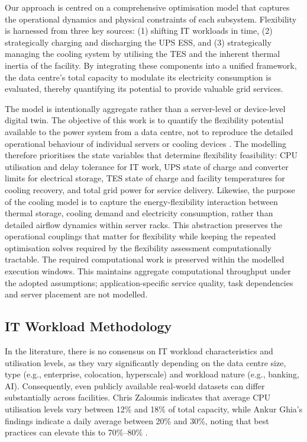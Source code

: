 \documentclass[lettersize,journal]{IEEEtran}
\providecommand{\DIFadd}[1]{{\color{blue}#1}}
\providecommand{\DIFaddbegin}{}
\providecommand{\DIFaddend}{}
\begin{document}
Our approach is centred on a comprehensive optimisation model that captures the operational dynamics and physical constraints of each subsystem. Flexibility is harnessed from three key sources: (1) shifting IT workloads in time, (2) strategically charging and discharging the  \DIFaddbegin \DIFadd{UPS ESS}\DIFaddend , and (3) strategically managing the cooling system by utilising the TES and the inherent thermal inertia of the facility. By integrating these components into a unified framework, the data centre's total capacity to modulate its electricity consumption is evaluated, thereby quantifying its potential to provide valuable grid services.

\DIFaddbegin \DIFadd{The model is intentionally aggregate rather than a server-level or device-level digital twin. The objective of this work is to quantify the flexibility potential available to the power system from a data centre, not to reproduce the detailed operational behaviour of individual servers or cooling devices \cite{barroso2018datacenter,dayarathna2015data}. The modelling therefore prioritises the state variables that determine flexibility feasibility: CPU utilisation and delay tolerance for IT work, UPS state of charge and converter limits for electrical storage, TES state of charge and facility temperatures for cooling recovery, and total grid power for service delivery. Likewise, the purpose of the cooling model is to capture the energy-flexibility interaction between thermal storage, cooling demand and electricity consumption, rather than detailed airflow dynamics within server racks. This abstraction preserves the operational couplings that matter for flexibility while keeping the repeated optimisation solves required by the flexibility assessment computationally tractable. The required computational work is preserved within the modelled execution windows. This maintains aggregate computational throughput under the adopted assumptions; application-specific service quality, task dependencies and server placement are not modelled.

}

\DIFaddend \label{sec: methodology}
\subsection{IT Workload Methodology}\DIFaddbegin \label{sec:it-workload-methodology}
 
\DIFaddend 

In the literature, there is no consensus on IT workload characteristics and utilisation levels, as they vary significantly depending on the data centre size, type (e.g., enterprise, colocation, hyperscale) and workload nature (e.g., banking, AI). Consequently, even publicly available real-world datasets can differ substantially across facilities. Chris Zaloumis \cite{Zaloumis2022IBM} indicates that average CPU  \DIFaddbegin \DIFadd{utilisation levels }\DIFaddend vary between 12\% and 18\% of total capacity, while Ankur Ghia's findings indicate a daily average between 20\% and 30\%, noting that best practices can elevate this to 70\%--80\% \cite{Ghia2011McKinsey}. 
\end{document}
